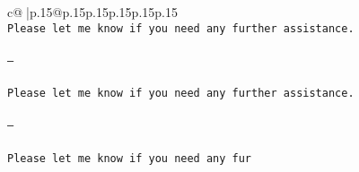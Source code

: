 \documentclass{article}
\begin{document}
{\begin{supertabular}{c@{$\;$}|p{.15\linewidth}@{}p{.15\linewidth}p{.15\linewidth}p{.15\linewidth}p{.15\linewidth}p{.15\linewidth}}
{{{\tt \\ \tt Please let me know if you need any further assistance. \\ \tt \\ \tt ---\\ \tt \\ \tt Please let me know if you need any further assistance. \\ \tt \\ \tt ---\\ \tt \\ \tt Please let me know if you need any fur}}}
\end{supertabular}}
\end{document}
